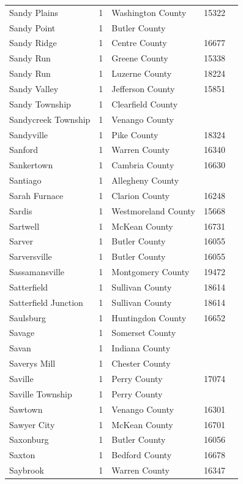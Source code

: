 \documentclass{article}
\begin{document}
\begin{tabular}{lllll}
Sandy Plains & 1 & Washington County & 15322 &  \\
Sandy Point & 1 & Butler County &  &  \\
Sandy Ridge & 1 & Centre County & 16677 &  \\
Sandy Run & 1 & Greene County & 15338 &  \\
Sandy Run & 1 & Luzerne County & 18224 &  \\
Sandy Valley & 1 & Jefferson County & 15851 &  \\
Sandy Township & 1 & Clearfield County &  &  \\
Sandycreek Township & 1 & Venango County &  &  \\
Sandyville & 1 & Pike County & 18324 &  \\
Sanford & 1 & Warren County & 16340 &  \\
Sankertown & 1 & Cambria County & 16630 &  \\
Santiago & 1 & Allegheny County &  &  \\
Sarah Furnace & 1 & Clarion County & 16248 &  \\
Sardis & 1 & Westmoreland County & 15668 &  \\
Sartwell & 1 & McKean County & 16731 &  \\
Sarver & 1 & Butler County & 16055 &  \\
Sarversville & 1 & Butler County & 16055 &  \\
Sassamansville & 1 & Montgomery County & 19472 &  \\
Satterfield & 1 & Sullivan County & 18614 &  \\
Satterfield Junction & 1 & Sullivan County & 18614 &  \\
Saulsburg & 1 & Huntingdon County & 16652 &  \\
Savage & 1 & Somerset County &  &  \\
Savan & 1 & Indiana County &  &  \\
Saverys Mill & 1 & Chester County &  &  \\
Saville & 1 & Perry County & 17074 &  \\
Saville Township & 1 & Perry County &  &  \\
Sawtown & 1 & Venango County & 16301 &  \\
Sawyer City & 1 & McKean County & 16701 &  \\
Saxonburg & 1 & Butler County & 16056 &  \\
Saxton & 1 & Bedford County & 16678 &  \\
Saybrook & 1 & Warren County & 16347 &  \\

\end{tabular}
\end{document}
